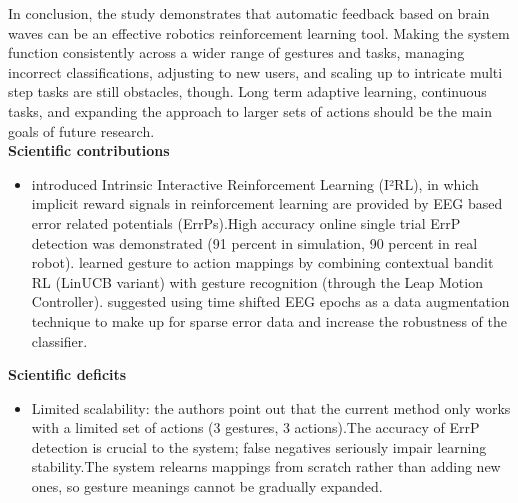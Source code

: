 \documentclass[report.tex]{subfiles}
\begin{document}
In conclusion, the study demonstrates that automatic feedback based on brain waves can be an effective robotics reinforcement learning tool. Making the system function consistently across a wider range of gestures and tasks, managing incorrect classifications, adjusting to new users, and scaling up to intricate multi step tasks are still obstacles, though. Long term adaptive learning, continuous tasks, and expanding the approach to larger sets of actions should be the main goals of future research.
\\




\noindent\textbf{Scientific contributions} 
\begin{itemize}
        \item introduced Intrinsic Interactive Reinforcement Learning (I²RL), in which implicit reward signals in reinforcement learning are provided by EEG based error related potentials (ErrPs).High accuracy online single trial ErrP detection was demonstrated (91 percent in simulation, 90 percent in real robot). learned gesture to action mappings by combining contextual bandit RL (LinUCB variant) with gesture recognition (through the Leap Motion Controller). suggested using time shifted EEG epochs as a data augmentation technique to make up for sparse error data and increase the robustness of the classifier.
        
\end{itemize}

\noindent\textbf{Scientific deficits} 
\begin{itemize}
        \item     Limited scalability: the authors point out that the current method only works with a limited set of actions (3 gestures, 3 actions).The accuracy of ErrP detection is crucial to the system; false negatives seriously impair learning stability.The system relearns mappings from scratch rather than adding new ones, so gesture meanings cannot be gradually expanded.
\end{itemize}
\end{document}
